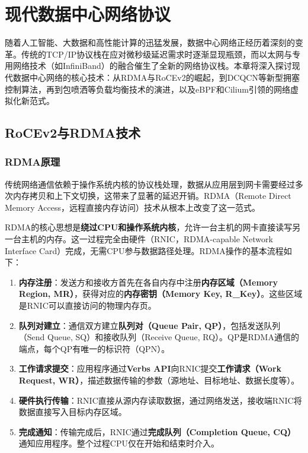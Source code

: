 
\section{现代数据中心网络协议}

随着人工智能、大数据和高性能计算的迅猛发展，数据中心网络正经历着深刻的变革。传统的TCP/IP协议栈在应对微秒级延迟需求时逐渐显现瓶颈，而以太网与专用网络技术（如InfiniBand）的融合催生了全新的网络协议栈。本章将深入探讨现代数据中心网络的核心技术：从RDMA与RoCEv2的崛起，到DCQCN等新型拥塞控制算法，再到包喷洒等负载均衡技术的演进，以及eBPF和Cilium引领的网络虚拟化新范式。

\subsection{RoCEv2与RDMA技术}

\subsubsection{RDMA原理}

传统网络通信依赖于操作系统内核的协议栈处理，数据从应用层到网卡需要经过多次内存拷贝和上下文切换，这带来了显著的延迟开销。RDMA（Remote Direct Memory Access，远程直接内存访问）技术从根本上改变了这一范式。

RDMA的核心思想是\textbf{绕过CPU和操作系统内核}，允许一台主机的网卡直接读写另一台主机的内存。这一过程完全由硬件（RNIC，RDMA-capable Network Interface Card）完成，无需CPU参与数据路径处理。RDMA操作的基本流程如下：

\begin{enumerate}
    \item \textbf{内存注册}：发送方和接收方首先在各自内存中注册\textbf{内存区域（Memory Region, MR）}，获得对应的\textbf{内存密钥（Memory Key, R\_Key）}。这些区域是RNIC可以直接访问的物理内存页。
    \item \textbf{队列对建立}：通信双方建立\textbf{队列对（Queue Pair, QP）}，包括发送队列（Send Queue, SQ）和接收队列（Receive Queue, RQ）。QP是RDMA通信的端点，每个QP有唯一的标识符（QPN）。
    \item \textbf{工作请求提交}：应用程序通过\textbf{Verbs API}向RNIC提交\textbf{工作请求（Work Request, WR）}，描述数据传输的参数（源地址、目标地址、数据长度等）。
    \item \textbf{硬件执行传输}：RNIC直接从源内存读取数据，通过网络发送，接收端RNIC将数据直接写入目标内存区域。
    \item \textbf{完成通知}：传输完成后，RNIC通过\textbf{完成队列（Completion Queue, CQ）}通知应用程序。整个过程CPU仅在开始和结束时介入。
\end{enumerate}

